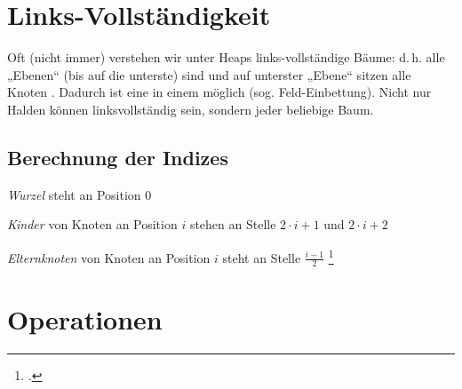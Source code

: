\documentclass{lehramt-informatik-haupt}
\begin{document}
%

\section{Links-Vollständigkeit}

Oft (nicht immer) verstehen wir unter Heaps links-vollständige Bäume:
d.\,h. alle „Ebenen“ (bis auf die unterste) sind 
und auf unterster „Ebene“ sitzen alle Knoten . Dadurch ist eine  in einem
 möglich (sog. Feld-Einbettung). Nicht nur Halden können
linksvollständig sein, sondern jeder beliebige Baum.

%

\subsection{Berechnung der Indizes}

\begin{compactitem}
\item \emph{Wurzel} steht an Position $0$

\item \emph{Kinder} von Knoten an Position $i$ stehen an Stelle
$2 \cdot i + 1$ und $2 \cdot i + 2$

\item \emph{Elternknoten} von Knoten an Position $i$ steht an Stelle
$\frac{i - 1}{2}$
\footcite[Seite 26]{aud:fs:tafeluebung-11}
\end{compactitem}

\begin{center}
\end{center}

%

\section{Operationen}
\end{document}
